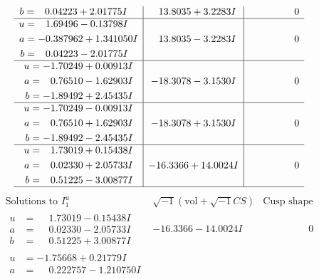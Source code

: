 \documentclass[1p]{elsarticle_modified}
\theoremstyle{definition}
\newcommand{\I}{\sqrt{-1}}
\begin{document}
$$\begin{array}{c|c|c}
\begin{aligned}
b &= \phantom{-}0.04223 + 2.01775 I\end{aligned}
 & \phantom{-}13.8035 + 3.2283 I & \phantom{-0.000000 } 0 \\ \hline\begin{aligned}
u &= \phantom{-}1.69496 - 0.13798 I \\
a &= -0.387962 + 1.341050 I \\
b &= \phantom{-}0.04223 - 2.01775 I\end{aligned}
 & \phantom{-}13.8035 - 3.2283 I & \phantom{-0.000000 } 0 \\ \hline\begin{aligned}
u &= -1.70249 + 0.00913 I \\
a &= \phantom{-}0.76510 - 1.62903 I \\
b &= -1.89492 + 2.45435 I\end{aligned}
 & -18.3078 - 3.1530 I & \phantom{-0.000000 } 0 \\ \hline\begin{aligned}
u &= -1.70249 - 0.00913 I \\
a &= \phantom{-}0.76510 + 1.62903 I \\
b &= -1.89492 - 2.45435 I\end{aligned}
 & -18.3078 + 3.1530 I & \phantom{-0.000000 } 0 \\ \hline\begin{aligned}
u &= \phantom{-}1.73019 + 0.15438 I \\
a &= \phantom{-}0.02330 + 2.05733 I \\
b &= \phantom{-}0.51225 - 3.00877 I\end{aligned}
 & -16.3366 + 14.0024 I & \phantom{-0.000000 } 0\\
 \hline 
 \end{array}$$\newpage$$\begin{array}{c|c|c}  
\text{Solutions to }I^u_{1}& \I (\text{vol} + \sqrt{-1}CS) & \text{Cusp shape}\\
 \hline 
\begin{aligned}
u &= \phantom{-}1.73019 - 0.15438 I \\
a &= \phantom{-}0.02330 - 2.05733 I \\
b &= \phantom{-}0.51225 + 3.00877 I\end{aligned}
 & -16.3366 - 14.0024 I & \phantom{-0.000000 } 0 \\ \hline\begin{aligned}
u &= -1.75668 + 0.21779 I \\
a &= \phantom{-}0.222757 - 1.210750 I \\

\end{aligned}
\end{array}$$
\end{document}
